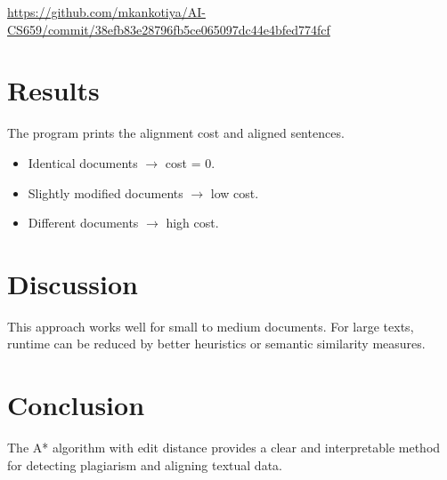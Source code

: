 \documentclass[12pt,a4paper]{article}
\begin{document}
\begin{center}
\Large \url{https://github.com/mkankotiya/AI-CS659/commit/38efb83e28796fb5ce065097dc44e4bfed774fcf}
\end{center}

\section*{Results}
The program prints the alignment cost and aligned sentences. 
\begin{itemize}
    \item Identical documents $\rightarrow$ cost = 0.  
    \item Slightly modified documents $\rightarrow$ low cost.  
    \item Different documents $\rightarrow$ high cost.  
\end{itemize}

\section*{Discussion}
This approach works well for small to medium documents. For large texts, runtime can be reduced by better heuristics or semantic similarity measures.

\section*{Conclusion}
The A* algorithm with edit distance provides a clear and interpretable method for detecting plagiarism and aligning textual data.
\end{document}
